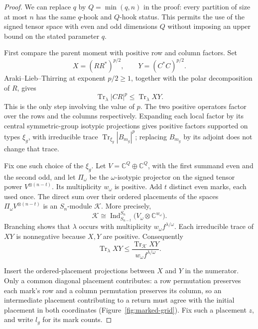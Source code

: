 \begin{proof}
We can replace $q$ by $Q=\min(q,n)$ in the proof: every partition of
size at most $n$ has the same $q$-hook and $Q$-hook status.  This permits
the use of the signed tensor space with even and odd dimensions $Q$
without imposing an upper bound on the stated parameter $q$.

First compare the parent moment with positive row and column factors.
Set
\[
 X=(RR^*)^{p/2},\qquad Y=(C^*C)^{p/2}.
\]
Araki--Lieb--Thirring at exponent $p/2\ge1$, together with the polar
decomposition of $R$, gives
\[
 \operatorname{Tr}_\lambda|CR|^p
 \le \operatorname{Tr}_\lambda XY.
\]
This is the only step involving the value of $p$.  The two positive
operators factor over the rows and the columns respectively.  Expanding
each local factor by its central symmetric-group isotypic projections
gives positive factors supported on types $\xi_g$, with irreducible
trace $\operatorname{Tr}_{\xi_g}|B_{m_g}|^p$; replacing $B_{m_g}$ by its
adjoint does not change that trace.

Fix one such choice of the $\xi_g$.  Let
$V=\mathbb C^Q\oplus\mathbb C^Q$, with the first summand even and the
second odd, and let $\Pi_\omega$ be the $\omega$-isotypic projector on
the signed tensor power $V^{\otimes(n-t)}$.  Its multiplicity $w_\omega$
is positive.  Add $t$ distinct even marks, each used once.  The direct
sum over their ordered placements of the spaces
$\Pi_\omega V^{\otimes(n-t)}$ is an $S_n$-module $\mathcal K$.  More
precisely,
\[
 \mathcal K\cong
 \operatorname{Ind}_{S_{n-t}}^{S_n}
       \bigl(V_\omega\otimes\mathbb C^{w_\omega}\bigr).
\]
Branching shows that $\lambda$ occurs with multiplicity
$w_\omega f^{\lambda/\omega}$.  Each irreducible trace of $XY$ is
nonnegative because $X,Y$ are positive.  Consequently
\[
 \operatorname{Tr}_\lambda XY
 \le \frac{\operatorname{Tr}_{\mathcal K}XY}
              {w_\omega f^{\lambda/\omega}}.
 \tag{$\ast$}
\]

Insert the ordered-placement projections between $X$ and $Y$ in the
numerator.  Only a common diagonal placement contributes: a row
permutation preserves each mark's row and a column permutation preserves
its column, so an intermediate placement contributing to a return must
agree with the initial placement in both coordinates
(Figure~\ref{fig:marked-grid}).  Fix such a
placement $z$, and write $l_g$ for its mark counts.


\end{proof}
